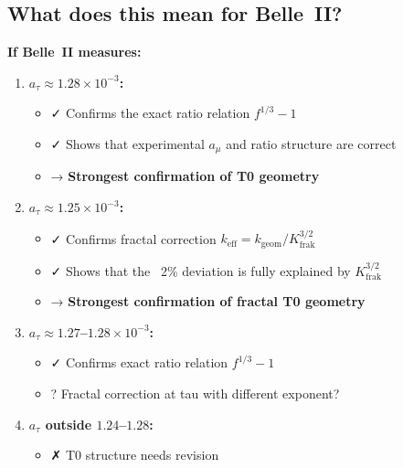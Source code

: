 	\begin{table}[h]
		\centering
		\caption{Three T0 predictions for $a_\tau$}
	\end{table}
	
	\subsection{What does this mean for Belle~II?}
	
	\textbf{If Belle~II measures:}
	
	\begin{enumerate}
		\item \textbf{$a_\tau \approx 1.28 \times 10^{-3}$:}
		\begin{itemize}
			\item ✓ Confirms the exact ratio relation $f^{1/3} - 1$
			\item ✓ Shows that experimental $a_\mu$ and ratio structure are correct
			\item → \textbf{Strongest confirmation of T0 geometry}
		\end{itemize}
		
		\item \textbf{$a_\tau \approx 1.25 \times 10^{-3}$:}
		\begin{itemize}
			\item ✓ Confirms fractal correction $k_{\text{eff}} = k_\text{geom}/K_\text{frak}^{3/2}$
			\item ✓ Shows that the ~2\% deviation is fully explained by $K_\text{frak}^{3/2}$
			\item → \textbf{Strongest confirmation of fractal T0 geometry}
		\end{itemize}
		
		\item \textbf{$a_\tau \approx 1.27$--$1.28 \times 10^{-3}$:}
		\begin{itemize}
			\item ✓ Confirms exact ratio relation $f^{1/3} - 1$
			\item ? Fractal correction at tau with different exponent?
		\end{itemize}
		
		\item \textbf{$a_\tau$ outside $1.24$--$1.28$:}
		\begin{itemize}
			\item ✗ T0 structure needs revision
		\end{itemize}
	\end{enumerate}
	
